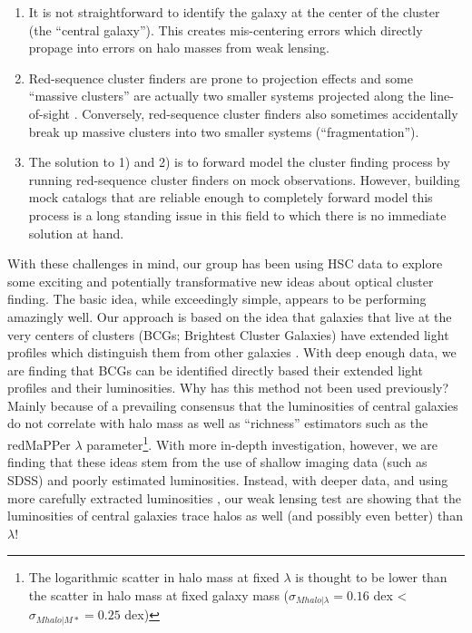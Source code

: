 \documentclass[letterpaper,12pt,dvips]{article}
\begin{document}
\begin{enumerate}
\item It is not straightforward to identify the galaxy at the center of the cluster (the ``central galaxy''). This creates mis-centering errors which directly propage into errors on halo masses from weak lensing.
\item Red-sequence cluster finders are prone to projection effects and some ``massive clusters'' are actually two smaller systems projected along the line-of-sight \citep[e.g.,][]{Busch:2017aa}. Conversely, red-sequence cluster finders also sometimes accidentally break up massive clusters into two smaller systems (``fragmentation''). 
\item The solution to 1) and 2) is to forward model the cluster finding process by running red-sequence cluster finders on mock observations. However, building mock catalogs that are reliable enough to completely forward model this process is a long standing issue in this field to which there is no immediate solution at hand.
\end{enumerate}


With these challenges in mind, our group has been using HSC data to explore some exciting and potentially transformative new ideas about optical cluster finding. The basic idea, while exceedingly simple, appears to be performing amazingly well. Our approach is based on the idea that galaxies that live at the very centers of clusters (BCGs; Brightest Cluster Galaxies) have extended light profiles which distinguish them from other galaxies \citep[][Huang et al. in prep]{Huang:2017a}. With deep enough data, we are finding that BCGs can be identified directly based their extended light profiles and their luminosities. Why has this method not been used previously? Mainly because of a prevailing consensus that the luminosities of central galaxies do not correlate with halo mass as well as ``richness'' estimators such as the redMaPPer $\lambda$ parameter\footnote{The logarithmic scatter in halo mass at fixed $\lambda$ is thought to be lower than the scatter in halo mass at fixed galaxy mass ($\sigma_{Mhalo|\lambda}=0.16$ dex < $\sigma_{Mhalo|M*}=0.25$ dex)}. With more in-depth investigation, however, we are finding that these ideas stem from the use of shallow imaging data (such as SDSS) and poorly estimated luminosities. Instead, with deeper data, and using more carefully extracted luminosities \citep[][]{Huang:2017a}, our weak lensing test are showing that the luminosities of central galaxies trace halos as well (and possibly even better) than $\lambda$!
\end{document}
